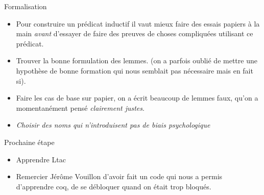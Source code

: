 \documentclass{beamer}
\begin{document}
\begin{frame}{Formalisation}
\begin{itemize}
\item Pour construire un prédicat inductif il vaut mieux faire des essais
papiers à la main \emph{avant} d'essayer de faire des preuves de choses
compliquées utilisant ce prédicat.
\pause
\item Trouver la bonne formulation des lemmes. (on a parfois oublié de mettre une
hypothèse de bonne formation qui nous semblait pas nécessaire mais en
fait si).
\pause
\item Faire les cas de base sur papier, on a écrit beaucoup de lemmes
faux, qu'on a momentanément pensé \emph{clairement justes}.
\pause
\item \emph{Choisir des noms qui n'introduisent pas de biais
psychologique}
\end{itemize}
\end{frame}

\begin{frame}{Prochaine étape}
\begin{itemize}
\item Apprendre Ltac
\item Remercier Jérôme Vouillon d'avoir fait un code qui nous a permis
d'apprendre coq, de se débloquer quand on était trop bloqués. 
\end{itemize}
\end{frame}
\end{document}
